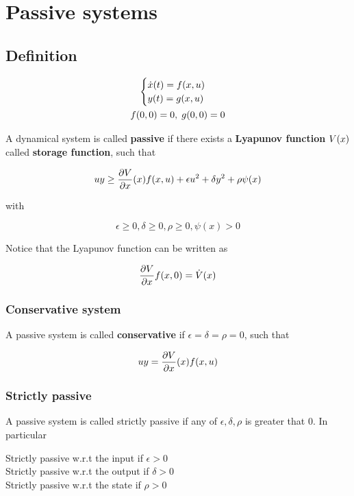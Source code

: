 \chapter{Passive systems}

\section{Definition}

\begin{gather*}
    \begin{cases}
        \dot{x} (t) = f(x,u) \\
        y(t) = g(x,u)
    \end{cases} \\
    f(0,0)=0, \; g(0,0)=0
\end{gather*}

A dynamical system is called \textbf{passive} if there exists a \textbf{Lyapunov function} $V(x)$ called \textbf{storage function}, such that

\[
    uy \geq \frac{\partial V}{\partial x}(x) f(x,u) + \epsilon u^2 + \delta y^2 + \rho \psi(x)
\]

with

\[
    \epsilon \geq 0, \delta \geq 0, \rho \geq 0, \psi(x) > 0
\]

Notice that the Lyapunov function can be written as

\[
     \frac{\partial V}{\partial x} f(x,0) = \dot{V}(x)
\]

\subsection{Conservative system}

A passive system is called \textbf{conservative} if $\epsilon = \delta = \rho = 0$, such that

\[
    uy = \frac{\partial V}{\partial x}(x) f(x,u)
\]

\subsection{Strictly passive}

A passive system is called strictly passive if any of $\epsilon, \delta, \rho$ is greater that $0$.
In particular

Strictly passive w.r.t the input if $\epsilon > 0$ \\
Strictly passive w.r.t the output if $\delta > 0$ \\
Strictly passive w.r.t the state if $\rho > 0$

